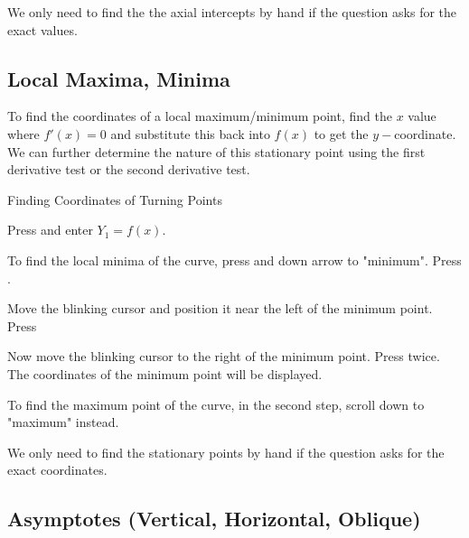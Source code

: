 \documentclass[11pt,a4paper]{book}
\begin{document}
\medskip{}

We only need to find the the axial intercepts by hand if the question asks for the exact values.

\bigskip

\subsection{Local Maxima, Minima}

To find the coordinates of a local maximum/minimum point, find the
$x$ value where $f'\left(x\right)=0$ and substitute this back into
$f\left(x\right)$ to get the $y-$coordinate. We can further determine the nature of this stationary point using the first derivative test or the
second derivative test.

\medskip

\begin{GC}{Finding Coordinates of Turning Points}

\begin{steps}
\item Press  and enter $Y_{1}=f\left(x\right)$.
\item To find the local minima of the curve, press      and down arrow to "minimum". Press .
\item Move the blinking cursor and position it near the left of the minimum point. Press 
\item Now move the blinking cursor to the right of the minimum point. Press  twice. The coordinates of the minimum point will be displayed.
\end{steps}
To find the maximum point of the curve, in the second step, scroll down to "maximum" instead.
\end{GC}

\medskip{}

We only need to find the stationary points by hand if the question asks for the exact coordinates.

\bigskip

\subsection{Asymptotes (Vertical, Horizontal, Oblique)}
\end{document}
